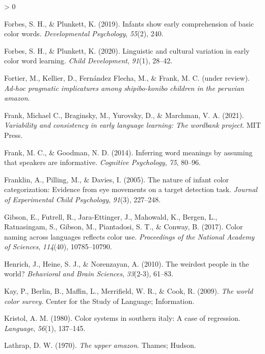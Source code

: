 \documentclass[
  english,
  ,apa7,floatsintext]{apa6}
\newlength{\cslhangindent}
\newenvironment{CSLReferences}[2] %
 {%
  \setlength{\parindent}{0pt}
  \ifodd #1 \everypar{\setlength{\hangindent}{\cslhangindent}}\ignorespaces\fi
  \ifnum #2 > 0
  \setlength{\parskip}{#2\baselineskip}
  \fi
 }%
 {}
\begin{document}
\begin{CSLReferences}{1}{0}
\leavevmode\hypertarget{ref-forbes2019}{}%
Forbes, S. H., \& Plunkett, K. (2019). Infants show early comprehension of basic color words. \emph{Developmental Psychology}, \emph{55}(2), 240.

\leavevmode\hypertarget{ref-forbes2020}{}%
Forbes, S. H., \& Plunkett, K. (2020). Linguistic and cultural variation in early color word learning. \emph{Child Development}, \emph{91}(1), 28--42.

\leavevmode\hypertarget{ref-fortierunderreview}{}%
Fortier, M., Kellier, D., Fernández Flecha, M., \& Frank, M. C. (under review). \emph{Ad-hoc pragmatic implicatures among shipibo-konibo children in the peruvian amazon}.

\leavevmode\hypertarget{ref-frank2020}{}%
Frank, Michael C., Braginsky, M., Yurovsky, D., \& Marchman, V. A. (2021). \emph{Variability and consistency in early language learning: The wordbank project}. MIT Press.

\leavevmode\hypertarget{ref-frank2014}{}%
Frank, M. C., \& Goodman, N. D. (2014). Inferring word meanings by assuming that speakers are informative. \emph{Cognitive Psychology}, \emph{75}, 80--96.

\leavevmode\hypertarget{ref-franklin2005}{}%
Franklin, A., Pilling, M., \& Davies, I. (2005). The nature of infant color categorization: Evidence from eye movements on a target detection task. \emph{Journal of Experimental Child Psychology}, \emph{91}(3), 227--248.

\leavevmode\hypertarget{ref-gibson2017}{}%
Gibson, E., Futrell, R., Jara-Ettinger, J., Mahowald, K., Bergen, L., Ratnasingam, S., Gibson, M., Piantadosi, S. T., \& Conway, B. (2017). Color naming across languages reflects color use. \emph{Proceedings of the National Academy of Sciences}, \emph{114}(40), 10785--10790.

\leavevmode\hypertarget{ref-henrich2010}{}%
Henrich, J., Heine, S. J., \& Norenzayan, A. (2010). The weirdest people in the world? \emph{Behavioral and Brain Sciences}, \emph{33}(2-3), 61--83.

\leavevmode\hypertarget{ref-berlin2009}{}%
Kay, P., Berlin, B., Maffin, L., Merrifield, W. R., \& Cook, R. (2009). \emph{The world color survey}. Center for the Study of Language; Information.

\leavevmode\hypertarget{ref-kristol1980}{}%
Kristol, A. M. (1980). Color systems in southern italy: A case of regression. \emph{Language}, \emph{56}(1), 137--145.

\leavevmode\hypertarget{ref-lathrap1970}{}%
Lathrap, D. W. (1970). \emph{The upper amazon}. Thames; Hudson.


\end{CSLReferences}
\end{document}

